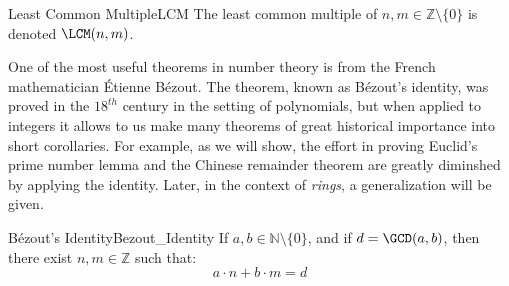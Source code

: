 \documentclass{article}                                                        %
\begin{document}
            \begin{fnotation}{Least Common Multiple}{LCM}
                The least common multiple of $n,m\in\mathbb{Z}\setminus\{0\}$ is
                denoted $\LCM(n,m)$.
            \end{fnotation}
            One of the most useful theorems in number theory is from the French
            mathematician \'{E}tienne B\'{e}zout. The theorem, known as
            B\'{e}zout's identity, was proved in the $18^{th}$ century in the
            setting of polynomials, but when applied to integers it allows to us
            make many theorems of great historical importance into short
            corollaries. For example, as we will show, the effort in proving
            Euclid's prime number lemma and the Chinese remainder theorem are
            greatly diminshed by applying the identity. Later, in the context of
            \textit{rings}, a generalization will be given.
            \begin{ftheorem}{B\'{e}zout's Identity}{Bezout_Identity}
                If $a,b\in\mathbb{N}\setminus\{0\}$, and if $d=\GCD(a,b)$, then
                there exist $n,m\in\mathbb{Z}$ such that:
                \begin{equation*}
                    a\cdot{n}+b\cdot{m}=d
                \end{equation*}
            \end{ftheorem}
\end{document}
